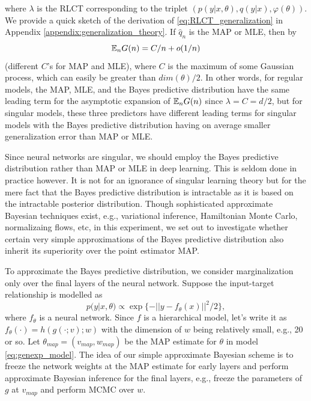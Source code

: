 \documentclass{article} %
\begin{document}
where $\lambda$ is the RLCT corresponding to the triplet $( p(y|x,\theta), q(y|x), \varphi(\theta) )$. We provide a quick sketch of the derivation of \eqref{eq:RLCT_generalization} in Appendix \ref{appendix:generalization_theory}.
If $\hat q_n$ is the MAP or MLE, then by {\cite[Theorem 6.4]{watanabe_algebraic_2009}}
$$
{\mathbb{E}}_n G(n) = C/n + o(1/n)
$$
(different $C$'s for MAP and MLE), where $C$ is the maximum of some Gaussian process, which can easily be greater than $dim(\theta)/2$. 
In other words, for regular models, the MAP, MLE, and the Bayes predictive distribution have the same leading term for the asymptotic expansion of ${\mathbb{E}}_n G(n)$ since $\lambda = C = d/2$, but for singular models, these three predictors have different leading terms for singular models with the Bayes predictive distribution having on average smaller generalization error than MAP or MLE. 

Since neural networks are singular, we should employ the Bayes predictive distribution rather than MAP or MLE in deep learning. This is seldom done in practice however. It is not for an ignorance of singular learning theory but for the mere fact that the Bayes predictive distribution is intractable as it is based on the intractable posterior distribution. 
Though sophisticated approximate Bayesian techniques exist, e.g., variational inference, Hamiltonian Monte Carlo, normalizaing flows, etc, in this experiment, we set out to investigate whether certain very simple approximations of the Bayes predictive distribution also inherit its superiority over the point estimator MAP. 

To approximate the Bayes predictive distribution, we consider marginalization only over the final layers of the neural network. Suppose the input-target relationship is modelled as
\begin{equation}
p(y|x,\theta) \propto \exp\{-|| y - f_\theta(x) ||^2/2\},
\label{eq:genexp_model}
\end{equation}
where $f_\theta$ is a neural network. Since $f$ is a hierarchical model, let's write it as $f_\theta(\cdot) = h(g(\cdot;v);w)$ with the dimension of $w$ being relatively small, e.g., 20 or so. Let $\theta_{map} = (v_{map}, w_{map})$ be the MAP estimate for $\theta$ in model \ref{eq:genexp_model}. The idea of our simple approximate Bayesian scheme is to freeze the network weights at the MAP estimate for early layers and perform approximate Bayesian inference for the final layers, e.g., freeze the parameters of $g$ at $v_{map}$ and perform MCMC over $w$. 
\end{document}
